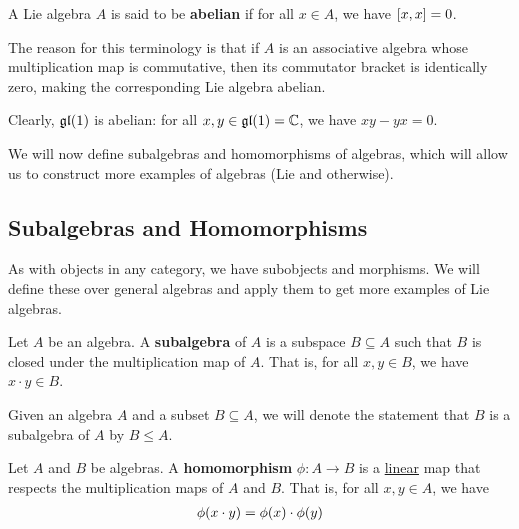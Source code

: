 \begin{boxdefinition}
    A Lie algebra $A$ is said to be \textbf{abelian} if for all $x \in A$, we have $\left[ x, x \right] = 0$.
\end{boxdefinition}

The reason for this terminology is that if $A$ is an associative algebra whose multiplication map is commutative, then its commutator bracket is identically zero, making the corresponding Lie algebra abelian.

\begin{boxexample}\label{Ch1:Eg:gl1}
    Clearly, $\mathfrak{gl}\!\left( 1 \right)$ is abelian: for all $x, y \in \mathfrak{gl}\!\left( 1 \right) = \mathbb{C}$, we have $xy - yx = 0$.
\end{boxexample}

We will now define subalgebras and homomorphisms of algebras, which will allow us to construct more examples of algebras (Lie and otherwise).

\subsection{Subalgebras and Homomorphisms}

As with objects in any category, we have subobjects and morphisms. We will define these over general algebras and apply them to get more examples of Lie algebras.

\begin{boxdefinition}[Subalgebras]
    Let $A$ be an algebra. A \textbf{subalgebra} of $A$ is a subspace $B \subseteq A$ such that $B$ is closed under the multiplication map of $A$. That is, for all $x, y \in B$, we have $x \cdot y \in B$.
\end{boxdefinition}

\begin{boxconvention}
    Given an algebra $A$ and a subset $B \subseteq A$, we will denote the statement that $B$ is a subalgebra of $A$ by $B \leq A$.
\end{boxconvention}

\begin{boxdefinition}[Homomorphisms]
    Let $A$ and $B$ be algebras. A \textbf{homomorphism} $\phi: A \to B$ is a \underline{linear} map that respects the multiplication maps of $A$ and $B$. That is, for all $x, y \in A$, we have
    \begin{align*}
        \phi\!\left( x \cdot y \right) = \phi\!\left( x \right) \cdot \phi\!\left( y \right)
    \end{align*}
\end{boxdefinition}

